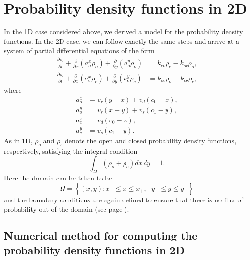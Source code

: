 
\section{Probability density functions in 2D}

In the 1D case considered above, we derived a model for the probability
density functions. In the 2D case, we can follow exactly the same steps and
arrive at a system of partial differential equations of the form
\begin{align}
\frac{\partial\rho_{o}}{\partial t}+\frac{\partial}{\partial x}\left(
a_{o}^{x}\rho_{o}\right)  +\frac{\partial}{\partial y}\left(  a_{o}^{y}%
\rho_{o}\right)   &  =k_{co}\rho_{c}-k_{oc}\rho_{o},\label{eq:pdf21}\\
\frac{\partial\rho_{c}}{\partial t}+\frac{\partial}{\partial x}\left(
a_{c}^{x}\rho_{c}\right)  +\frac{\partial}{\partial y}\left(  a_{c}^{y}%
\rho_{c}\right)   &  =k_{oc}\rho_{o}-k_{co}\rho_{c},\label{eq:pdf22}%
\end{align}
where 
\begin{align}
a_{o}^{x} &  =v_{r}\left(  y-x\right)  +v_{d}\left(  c_{0}-x\right)
,\nonumber\\
a_{o}^{y} &  =v_{r}\left(  x-y\right)  +v_{s}\left(  c_{1}-y\right)
,\label{eq:fluxes2D2}\\
a_{c}^{x} &  =v_{d}\left(  c_{0}-x\right)  ,\nonumber\\
a_{c}^{y} &  =v_{s}\left(  c_{1}-y\right)  .\nonumber
\end{align}
As in 1D, $\rho_{o}$ and $\rho_{c}$ denote the open and closed probability
density functions, respectively, satisfying the integral condition%
\begin{equation}
\int_{\Omega}\left(  \rho_{o}+\rho_c\right)  dx\, dy=1. \label{int10000}
\end{equation}
Here the domain can be taken to be
\begin{equation}
\Omega=\left\{  (x,y):x_{-}\leqslant x\leqslant x_{+},\text{ }y_{-}\leqslant
y\leqslant y_{+}\right\}
\end{equation}
and the boundary conditions are again defined to ensure that there is
no flux of probability out of the domain (see page \pageref{bc}).

\subsection{Numerical method for computing the probability density functions in 2D}

